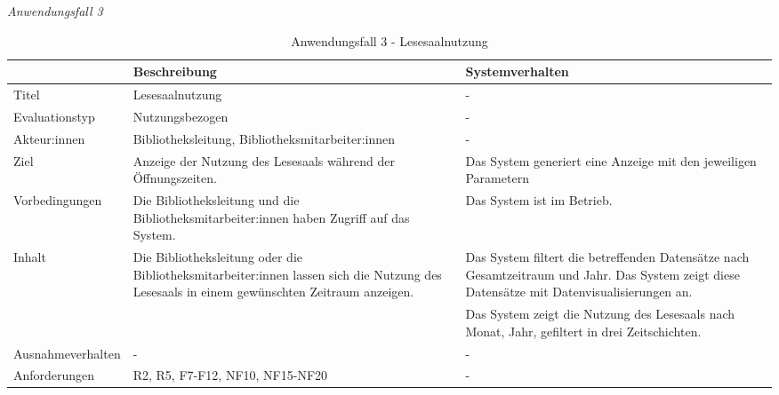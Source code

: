 \newpage
\noindent
\textit{Anwendungsfall 3}

\begingroup
\setlength{\tabcolsep}{10pt} %
\renewcommand{\arraystretch}{1.25} 
\begin{table}[h]
    \centering
    \begin{adjustbox}{max width=\textwidth}
    \begin{tabular}{lp{7.0cm}p{7.0cm}}
       \toprule
       \textbf{}          & \textbf{Beschreibung} &\textbf{Systemverhalten}\\
       \midrule
        Titel                            &Lesesaalnutzung& -\\
        Evaluationstyp                   &Nutzungsbezogen                   & -\\
        Akteur:innen                     &Bibliotheksleitung, Bibliotheksmitarbeiter:innen& -\\
        Ziel                             &Anzeige der Nutzung des Lesesaals während der Öffnungszeiten.& Das System generiert eine Anzeige mit den jeweiligen Parametern\\
        Vorbedingungen                   &Die Bibliotheksleitung und die Bibliotheksmitarbeiter:innen haben Zugriff auf das System.& Das System ist im Betrieb.\\
        Inhalt                          &Die Bibliotheksleitung oder die Bibliotheksmitarbeiter:innen lassen sich die Nutzung des Lesesaals in einem gewünschten Zeitraum anzeigen. & Das System filtert die betreffenden Datensätze nach Gesamtzeitraum und Jahr. Das System zeigt diese Datensätze mit Datenvisualisierungen an.\\
                                         & &Das System zeigt die Nutzung des Lesesaals nach Monat, Jahr, gefiltert in drei Zeitschichten.\\
        Ausnahmeverhalten               &- & -\\

        Anforderungen                   &R2, R5, F7-F12, NF10, NF15-NF20& -\\
        \bottomrule
    \end{tabular}
    \end{adjustbox}
    \caption{%
    Anwendungsfall 3 - Lesesaalnutzung    }
    \label{tab:AF_Lesesaalnutzung}
    \end{table}
\endgroup


